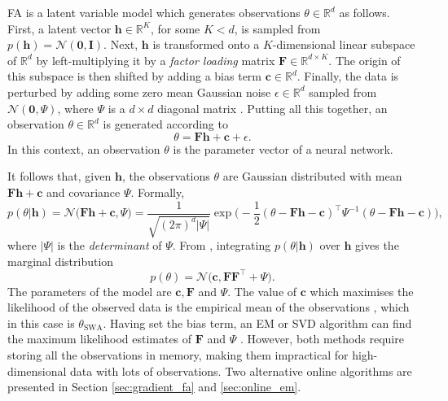 \documentclass[msc,deptreport.inf]{infthesis} %
\newcommand{\matr}[1]{\mathbf{#1}}
\newcommand{\R}{\mathbb R}
\begin{document}
FA is a latent variable model which generates observations $\theta \in \R^d$ as follows. First, a latent vector $\matr{h} \in \R^K$, for some $K < d$, is sampled from $p(\matr{h}) = \mathcal{N}(\matr{0}, \matr{I})$. Next, $\matr{h}$ is transformed onto a $K$-dimensional linear subspace of $\R^d$ by left-multiplying it by a \emph{factor loading} matrix $\matr{F} \in \R^{d \times K}$. The origin of this subspace is then shifted by adding a bias term $\matr{c} \in \R^d$. Finally, the data is perturbed by adding some zero mean Gaussian noise $\epsilon \in \R^d$ sampled from $\mathcal{N}(\matr{0}, \Psi)$, where $\Psi$ is a $d\times d$ diagonal matrix \cite{barber2007}. Putting all this together, an observation $\theta \in \R^d$ is generated according to 
\begin{equation}\label{eqn:fa_model}
	\theta = \matr{Fh} + \matr{c} + \epsilon.
\end{equation}
In this context, an observation $\theta$ is the parameter vector of a neural network. 

It follows that, given $\matr{h}$, the observations $\theta$ are Gaussian distributed with mean $\matr{Fh} + \matr{c}$ and covariance $\Psi$. Formally,
\begin{equation}\label{eqn:fa_cond_dist}
	p(\theta | \matr{h}) 
	= \mathcal{N}\Big( \matr{Fh} + \matr{c}, \Psi \Big)
	= \frac{1}{\sqrt{(2\pi)^d |\Psi|}} 
	\exp \Big(-\frac{1}{2} (\theta - \matr{Fh} - \matr{c})^\intercal \Psi^{-1} (\theta - \matr{Fh} 	- \matr{c})\Big),
\end{equation}
where $|\Psi|$ is the \emph{determinant} of $\Psi$. From \cite{barber2007}, integrating $p(\theta | \matr{h})$ over $\matr{h}$ gives the marginal distribution
\begin{equation}\label{eqn:fa_marginal_dist}
	p(\theta) = \mathcal{N}\big(\matr{c}, \matr{FF}^{\intercal} + \Psi\big).
\end{equation}
The parameters of the model are $\matr{c}, \matr{F}$ and $\Psi$. The value of $\matr{c}$ which maximises the likelihood of the observed data is the empirical mean of the observations \cite{barber2007}, which in this case is $\theta_{\text{SWA}}$. 
Having set the bias term, an EM or SVD algorithm can find the maximum likelihood estimates of $\matr{F}$ and $\Psi$ \cite{barber2007}. However, both methods require storing all the observations in memory, making them impractical for high-dimensional data with lots of observations. Two alternative online algorithms are presented in Section \ref{sec:gradient_fa} and \ref{sec:online_em}.
\end{document}
